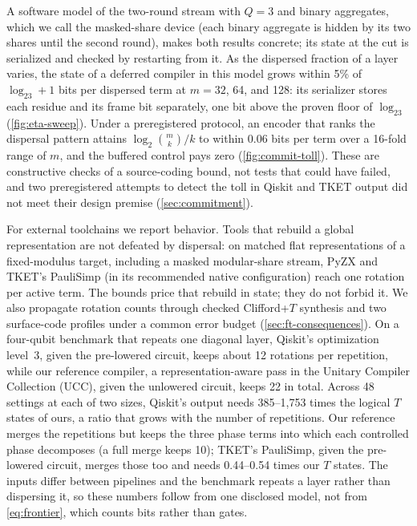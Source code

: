 \documentclass[aps,prx,reprint,superscriptaddress,floatfix,longbibliography]{revtex4-2}
\begin{document}
A software model of the two-round stream with $Q=3$ and binary
aggregates, which we call the masked-share device (each binary aggregate
is hidden by its two shares until the second round), makes both results
concrete; its state at the cut is serialized and checked by restarting
from it.  As the dispersed fraction of a layer varies, the state of a
deferred compiler in this model grows within 5\% of $\log_23+1$ bits per
dispersed term at $m=32$, 64, and 128: its serializer stores each residue
and its frame bit separately, one bit above the proven floor of
$\log_23$ (\cref{fig:eta-sweep}).  Under a preregistered
protocol, an encoder that ranks the dispersal pattern attains
$\log_2\binom{m}{k}/k$ to within 0.06 bits per term over a 16-fold range
of $m$, and the buffered control pays zero (\cref{fig:commit-toll}).
These are constructive checks of a source-coding bound, not tests that
could have failed, and two preregistered attempts to detect the toll in
Qiskit and TKET output did not meet their design premise
(\cref{sec:commitment}).

For external toolchains we report behavior.  Tools that rebuild a global
representation are not defeated by dispersal: on matched flat
representations of a fixed-modulus target, including a masked
modular-share stream, PyZX and TKET's PauliSimp (in its recommended native
configuration) reach one rotation per active term.  The bounds price that
rebuild in state; they do not forbid it.  We also propagate rotation
counts through checked Clifford+$T$ synthesis and two surface-code
profiles under a common error budget (\cref{sec:ft-consequences}).  On a
four-qubit benchmark that repeats one diagonal layer, Qiskit's
optimization level~3, given the pre-lowered circuit, keeps about 12
rotations per repetition, while our reference compiler, a
representation-aware pass in the Unitary Compiler Collection (UCC), given
the unlowered circuit, keeps 22 in total.  Across 48 settings at each of two sizes, Qiskit's
output needs 385--1{,}753 times the logical $T$ states of ours, a ratio
that grows with the number of repetitions.  Our reference merges the
repetitions but keeps the three phase terms into which each controlled
phase decomposes (a full merge keeps 10); TKET's PauliSimp, given the
pre-lowered circuit, merges those too and needs 0.44--0.54 times our $T$
states.  The inputs differ between pipelines and the benchmark repeats a
layer rather than dispersing it, so these numbers follow from one
disclosed model, not from \cref{eq:frontier}, which counts bits rather
than gates.
\end{document}
